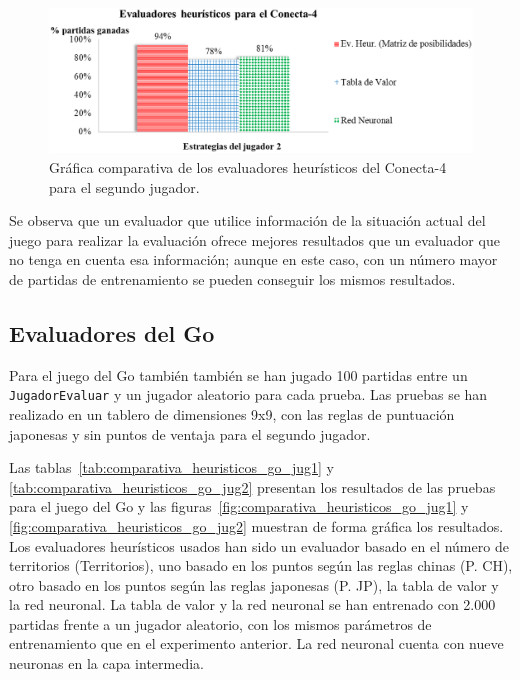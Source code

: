 \begin{figure}[!h]
	\centering
	\includegraphics[scale=0.3]{contenido/cap7/imagenes/heuristicosConecta4jug2.eps}
	\caption[Comparativa de los evaluadores heurísticos del Conecta-4 (II)]{Gráfica comparativa de los evaluadores heurísticos del Conecta-4 para el segundo jugador.}
	\label{fig:comparativa_heuristicos_conecta4_jug2}
\end{figure} 
 
Se observa que un evaluador que utilice información de la situación actual del juego para realizar la evaluación ofrece mejores resultados que un evaluador que no tenga en cuenta esa información; aunque en este caso, con un número mayor de partidas de entrenamiento se pueden conseguir los mismos resultados.

\subsection{Evaluadores del Go}
\label{ssec:comparativa_evaluadores_go}
Para el juego del Go también también se han jugado 100 partidas entre un \texttt{JugadorEvaluar} y un jugador aleatorio para cada prueba.
Las pruebas se han realizado en un tablero de dimensiones 9x9, con las reglas de puntuación japonesas y sin puntos de ventaja para el segundo jugador.

Las tablas~\ref{tab:comparativa_heuristicos_go_jug1} y \ref{tab:comparativa_heuristicos_go_jug2} presentan los resultados de las pruebas para el juego del Go y las figuras~\ref{fig:comparativa_heuristicos_go_jug1} y \ref{fig:comparativa_heuristicos_go_jug2} muestran de forma gráfica los resultados. 
Los evaluadores heurísticos usados han sido un evaluador basado en el número de territorios (Territorios), uno basado en los puntos según las reglas chinas (P. CH), otro basado en los puntos según las reglas japonesas (P. JP), la tabla de valor y la red neuronal.
La tabla de valor y la red neuronal se han entrenado con 2.000 partidas frente a un jugador aleatorio, con los mismos parámetros de entrenamiento que en el experimento anterior.
La red neuronal cuenta con nueve neuronas en la capa intermedia.

